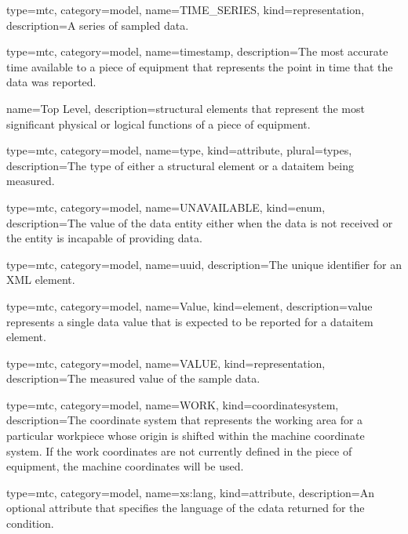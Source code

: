 {
  type=mtc,
  category=model,
  name={TIME\_SERIES},
  kind={representation},
  description={A series of sampled data. }
}


{
  type=mtc,
  category=model,
  name={timestamp},
  description={The most accurate time available to a piece of equipment that represents the point in time that the data was reported.}
}


{
  name={Top Level},
  description={\glspl{structural element} that represent the most significant physical or logical functions of a piece of equipment.}
}


{
  type=mtc,
  category=model,
  name={type},
  kind={attribute},
  plural={types},
  description={The type of either a \gls{structural element} or a \gls{dataitem} being measured.}
}


{
  type=mtc,
  category=model,
  name={UNAVAILABLE},
  kind={enum},
  description={The value of the \gls{data entity} either when the data is not received or the entity is incapable of providing data.}
}


{
  type=mtc,
  category=model,
  name={uuid},
  description={The unique identifier for an XML element.}
}



{
  type=mtc,
  category=model,
  name={Value},
  kind={element},
  description={\gls{value} represents a single data value that is expected to be reported for a \gls{dataitem} element. }
}


{
  type=mtc,
  category=model,
  name={VALUE},
  kind={representation},
  description={The measured value of the sample data.}
}


{
  type=mtc,
  category=model,
  name={WORK},
  kind={coordinatesystem},
  description={The coordinate system that represents the working area for a particular workpiece whose origin is shifted within the \gls{machine} coordinate system. If the \gls{work} coordinates are not currently defined in the piece of equipment, the \gls{machine} coordinates will be used.}
}


{
  type=mtc,
  category=model,
  name={xs:lang},
  kind={attribute},
  description={An optional attribute that specifies the language of the \gls{cdata} returned for the \gls{condition}.}
}


